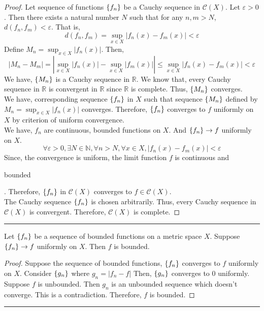 \begin{proof}
	Let sequence of functions $\left\{f_n\right\}$ be a Cauchy sequence in $\mathscr{C}(X)$.
	Let $\varepsilon > 0$.
	Then there exists a natural number $N$ such that for any $n,m > N$, $d(f_n,f_m) < \varepsilon$.
	That is, 
	\[ d(f_n,f_m) = \sup_{x \in X} |f_n(x) - f_m(x)| < \varepsilon \]
	Define $M_n = \sup_{x \in X} |f_n(x)|$.
	Then,
	\[ |M_n - M_m| = \left| \sup_{x \in X} |f_n(x)| - \sup_{x \in X}|f_m(x)| \right| \le \sup_{x \in X} |f_n(x) - f_m(x) | < \varepsilon \]
	We have, $\left\{M_n\right\}$ is a Cauchy sequence in $\mathbb{R}$.
	We know that, every Cauchy sequence in $\mathbb{R}$ is convergent in $\mathbb{R}$ since $\mathbb{R}$ is complete.
	Thus, $\left\{M_n\right\}$ converges.\\

	We have, corresponding  sequence $\left\{f_n\right\}$ in $X$ such that sequence $\left\{M_n\right\}$ defined by $M_n = \sup_{x \in X} |f_n(x)|$ converges.
	Therefore, $\left\{f_n\right\}$ converges to $f$ uniformly on $X$ by criterion of uniform convergence.\\

	We have, $f_n$ are continuous, bounded functions on $X$.
	And $\left\{f_n\right\} \to f$ uniformly on $X$.
	\[ \forall \varepsilon > 0, \exists N \in \mathbb{N}, \forall n > N, \forall x \in X, |f_n(x) - f_m(x)| < \varepsilon \]
	Since, the convergence is uniform, the limit function $f$ is continuous and \begin{important}bounded\end{important}.
	Therefore, $\left\{f_n\right\}$ in $\mathscr{C}(X)$ converges to $f \in \mathscr{C}(X)$.\\

	The Cauchy sequence $\left\{f_n\right\}$ is chosen arbitrarily.
	Thus, every Cauchy sequence in $\mathscr{C}(X)$ is convergent.
	Therefore, $\mathscr{C}(X)$ is complete.
\end{proof}

\hrule
\begin{remark}\cite[Exercise 7.1]{rudin}
	Let $\left\{f_n\right\}$ be a sequence of bounded functions on a metric space $X$.
	Suppose $\left\{f_n\right\} \to f$ uniformly on $X$.
	Then $f$ is bounded.
\end{remark}
\begin{proof}
	Suppose the sequence of bounded functions, $\left\{f_n\right\}$ converges to $f$ uniformly on $X$.
	Consider $\left\{g_n\right\}$ where $g_n = |f_n - f|$
	Then, $\left\{g_n\right\}$ converges to $0$ uniformly.
	Suppose $f$ is unbounded.
	Then $g_n$ is an unbounded sequence which doesn't converge.
	This is a contradiction.
	Therefore, $f$ is bounded.
\end{proof}
\hrule

